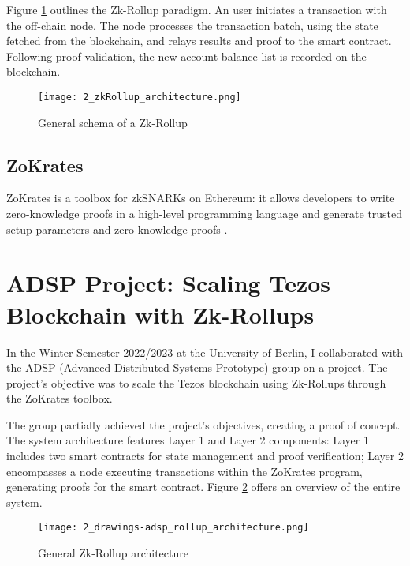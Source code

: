 Figure \ref{fig:2_zkRollup_schema} outlines the Zk-Rollup paradigm. An user initiates a transaction with the off-chain node. The node processes the transaction batch, using the state fetched from the blockchain, and relays results and proof to the smart contract. Following proof validation, the new account balance list is recorded on the blockchain.

\begin{figure}[ht]
  \centering
  \texttt{[image: 2\_zkRollup\_architecture.png]}
  \caption[Zk-Rollup Schema]{General schema of a Zk-Rollup\cite{ise_department_tub_material_nodate}}  
  \label{fig:2_zkRollup_schema}
\end{figure}

\subsection{ZoKrates}
ZoKrates is a toolbox for zkSNARKs on Ethereum: it allows developers to write zero-knowledge proofs in a high-level programming language and generate trusted setup parameters and zero-knowledge proofs \cite{eberhardt_ZoKrates_2018}.


\section{ADSP Project: Scaling Tezos Blockchain with Zk-Rollups}
In the Winter Semester 2022/2023 at the University of Berlin, I collaborated with the ADSP (Advanced Distributed Systems Prototype) group on a project. The project's objective was to scale the Tezos blockchain using Zk-Rollups through the ZoKrates toolbox.

The group partially achieved the project's objectives, creating a proof of concept. The system architecture features Layer 1 and Layer 2 components: Layer 1 includes two smart contracts for state management and proof verification; Layer 2 encompasses a node executing transactions within the ZoKrates program, generating proofs for the smart contract. Figure \ref{fig:2_general_rollup_architecture} offers an overview of the entire system.

\begin{figure}[ht]
  \centering
  \texttt{[image: 2\_drawings-adsp\_rollup\_architecture.png]}
  \caption[Zk-Rollup Architecture]{General Zk-Rollup architecture}  
  \label{fig:2_general_rollup_architecture}
\end{figure}

